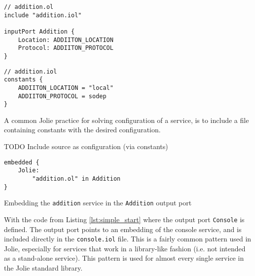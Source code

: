 \begin{listing}[H]
\begin{multicols}{2}

\begin{verbatim}
// addition.ol
include "addition.iol"

inputPort Addition {
    Location: ADDIITON_LOCATION
    Protocol: ADDIITON_PROTOCOL
}
\end{verbatim}

\columnbreak

\begin{verbatim}
// addition.iol
constants {
    ADDIITON_LOCATION = "local"
    ADDIITON_PROTOCOL = sodep
}
\end{verbatim}

\end{multicols}

\caption{A common Jolie practice for solving configuration of a service, is to
    include a file containing constants with the desired configuration.}

\label{lst:include_as_conf}

\end{listing}

\begin{observation}
    TODO Include source as configuration (via constants)
\end{observation}

\begin{listing}[H]
\begin{verbatim}
embedded {
    Jolie:
        "addition.ol" in Addition
}
\end{verbatim}

\caption{Embedding the \texttt{addition} service in the
    \texttt{Addition} output port}

\label{lst:simple_embedding}

\end{listing}

With the code from Listing \ref{lst:simple_start} where the output port
\texttt{Console} is defined. The output port points to an embedding
of the console service, and is included directly in the \verb!console.iol!
file. This is a fairly common pattern used in Jolie, especially for services
that work in a library-like fashion (i.e. not intended as a stand-alone
service). This pattern is used for almost every single service in the Jolie
standard library.

